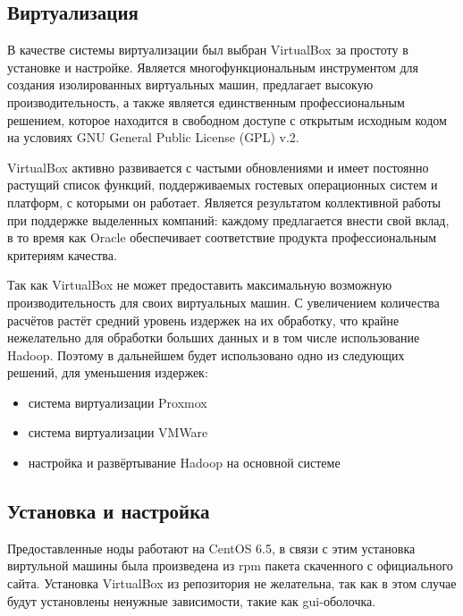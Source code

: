 \subsection{Виртуализация}
В качестве системы виртуализации был выбран VirtualBox за простоту в установке и настройке. Является 
многофункциональным инструментом для создания изолированных виртуальных машин, предлагает высокую 
производительность, а также является единственным профессиональным решением, которое находится в свободном 
доступе с открытым исходным кодом на условиях GNU General Public License (GPL) v.2.

VirtualBox активно развивается с частыми обновлениями и имеет постоянно растущий список функций, 
поддерживаемых гостевых операционных систем и платформ, с которыми он работает. Является результатом 
коллективной работы при поддержке выделенных компаний: каждому предлагается внести свой вклад, в то время 
как Oracle обеспечивает соответствие продукта профессиональным критериям качества. 

Так как VirtualBox не может предоставить максимальную возможную производительность для своих виртуальных 
машин. С увеличением количества расчётов растёт средний уровень издержек на их обработку, что крайне 
нежелательно для обработки больших данных и в том числе использование Hadoop. Поэтому в дальнейшем будет 
использовано одно из следующих решений, для уменьшения издержек:
\begin{itemize}
    \item система виртуализации Proxmox
    \item система виртуализации VMWare
    \item настройка и развёртывание Hadoop на основной системе
\end{itemize}

\subsection{Установка и настройка}
Предоставленные ноды работают на CentOS 6.5, в связи с этим установка виртульной машины была произведена из 
rpm пакета скаченного с официального сайта. Установка VirtualBox из репозитория не желательна, так как в 
этом случае будут установлены ненужные зависимости, такие как gui-оболочка.

